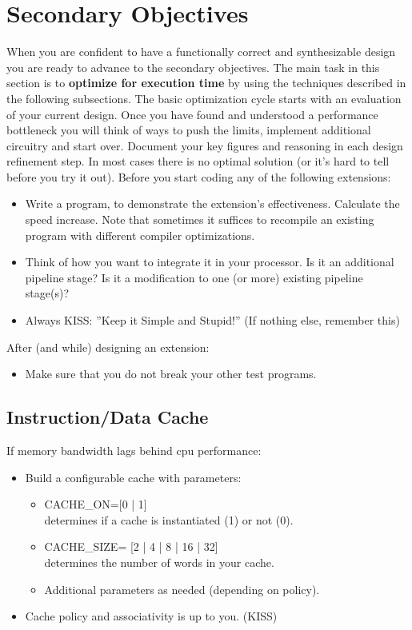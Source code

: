 \section{Secondary Objectives}
When you are confident to have a functionally correct and synthesizable design you are ready to advance to the secondary objectives. The main task in this section is to 
\textbf{optimize for execution time} by using the techniques described in the following subsections. The basic optimization cycle starts with an evaluation of your current design. Once you have found and understood a performance bottleneck you will think of ways to push the limits, implement additional circuitry and start over.  Document your key figures and reasoning in each design refinement step. In most cases there is no optimal solution (or it's hard to tell before you try it out).
Before you start coding any of the following extensions:
\begin{itemize}
\item Write a program, to demonstrate the extension's effectiveness. Calculate the speed increase. Note that sometimes it suffices to recompile an existing program with different compiler optimizations.
\item Think of how you want to integrate it in your processor. Is it an additional pipeline stage? Is it a modification to one (or more) existing pipeline stage(s)?
\item Always KISS: ''Keep it Simple and Stupid!'' (If nothing else, remember this)
\end{itemize}
After (and while) designing an extension:
\begin{itemize}
\item Make sure that you do not break your other test programs.
\end{itemize}

\subsection{Instruction/Data Cache}
If memory bandwidth lags behind cpu performance:
\begin{itemize}
\item Build a configurable cache with parameters:
\begin{itemize}
\item	CACHE\_ON=[0 | 1]\\
		determines if a cache is instantiated (1) or not (0).
\item	CACHE\_SIZE= [2 | 4 | 8 | 16 | 32]\\
		determines the number of words in your cache.
\item	Additional parameters as needed (depending on policy).
\end{itemize} 
\item Cache policy and associativity is up to you. (KISS)
\end{itemize}

